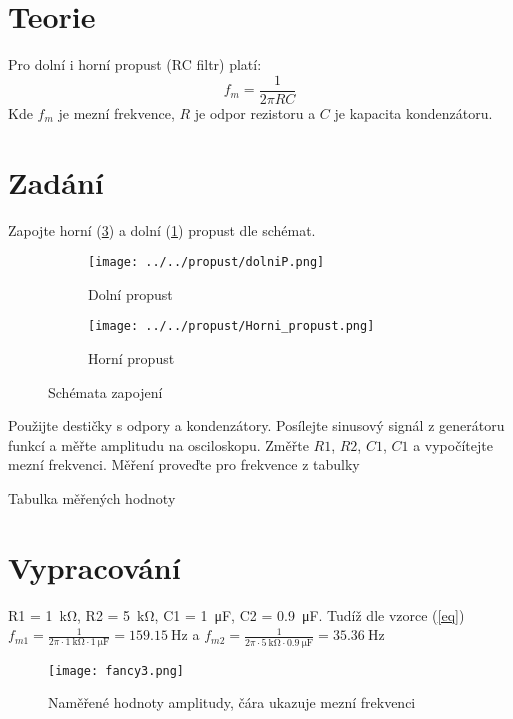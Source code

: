\documentclass[12pt,a4paper]{article}
\begin{document}



\section*{Teorie}
Pro dolní i horní propust (RC filtr) platí: 
\begin{equation}
	\label{eq}
	f_m = \frac{1}{2\pi R C }
\end{equation}
Kde $f_m$ je mezní frekvence, $R$ je odpor rezistoru a  $C$ je kapacita kondenzátoru.

\section*{Zadání}
Zapojte horní (\ref{fig:HP}) a dolní (\ref{fig:LP}) propust dle schémat.
\begin{figure}[H]
	\centering
	\begin{subfigure}[b]{0.42\textwidth}
		\centering
		\texttt{[image: ../../propust/dolniP.png]}
		\caption{Dolní propust}
		\label{fig:LP}
	\end{subfigure}
	\hfill
	\begin{subfigure}[b]{0.42\textwidth}
		\centering
		\texttt{[image: ../../propust/Horni\_propust.png]}
		\caption{Horní propust}
		\label{fig:HP}
	\end{subfigure}
	\caption{Schémata zapojení}
\end{figure}
Použijte destičky s odpory a kondenzátory. Posílejte sinusový signál z generátoru funkcí a měřte amplitudu na osciloskopu. Změřte $R1$, $R2$, $C1$, $C1$ a vypočítejte mezní frekvenci. Měření proveďte pro frekvence z tabulky
\begin{table}[h!]
	\begin{center}\def\arraystretch{1}
		\caption{Tabulka měřených hodnoty}
		\label{table1}
	\end{center}
\end{table}
\section*{Vypracování}
	R1 = \SI{1}{\kilo\ohm},
	R2 = \SI{5}{\kilo\ohm},
	C1 = \SI{1}{\micro\farad},
	C2 = \SI{0.9}{\micro\farad}.
Tudíž dle vzorce (\ref{eq}) $f_{m1} = \frac{1}{2\pi\cdot \SI{1}{\kilo\ohm}\cdot \SI{1}{\micro\farad}} = \SI{159.15}{\hertz}$ a $f_{m2} = \frac{1}{2\pi\cdot \SI{5}{\kilo\ohm}\cdot \SI{0.9}{\micro\farad}} = \SI{35.36}{\hertz}$
\begin{figure}[H]
	\centering
	\texttt{[image: fancy3.png]}
	\caption{Naměřené hodnoty amplitudy, čára ukazuje mezní frekvenci}
\end{figure}
\end{document}
